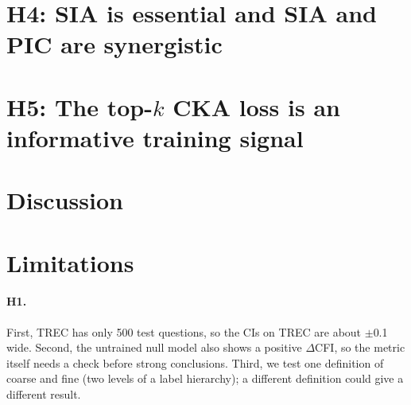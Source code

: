 \documentclass[11pt]{article}
\begin{document}
\section{H4: SIA is essential and SIA and PIC are synergistic}
\label{sec:h4}

\section{H5: The top-$k$ CKA loss is an informative training signal}
\label{sec:h5}

\section{Discussion}
\label{sec:discussion}

\section*{Limitations}

\paragraph{H1.}
First, TREC has only 500 test questions, so the CIs on TREC are about $\pm$0.1 wide.
Second, the untrained null model also shows a positive $\Delta$CFI, so the metric itself needs a check before strong conclusions.
Third, we test one definition of coarse and fine (two levels of a label hierarchy); a different definition could give a different result.
\end{document}
